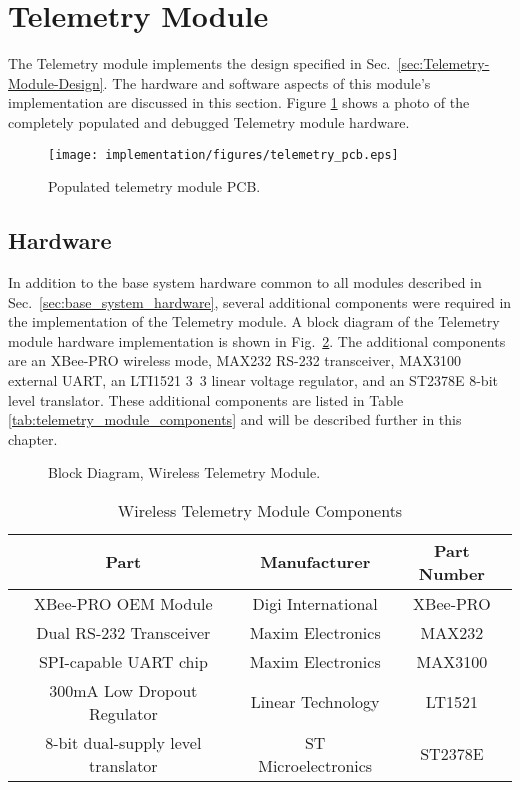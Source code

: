 \section{Telemetry Module}

The Telemetry module implements the design specified in Sec.\ \ref{sec:Telemetry-Module-Design}. The hardware and software aspects of this module's implementation are discussed in this section. Figure \ref{fig:telemetry_pcb} shows a photo of the completely populated and debugged Telemetry module hardware.

\begin{figure}[H]
\centering
\texttt{[image: implementation/figures/telemetry\_pcb.eps]}
\caption{Populated telemetry module PCB.}\label{fig:telemetry_pcb}
\end{figure}

\subsection{Hardware}

In addition to the base system hardware common to all modules described in Sec.\ \ref{sec:base_system_hardware}, several additional components were required in the implementation of the Telemetry module. A block diagram of the Telemetry module hardware implementation is shown in Fig.\ \ref{fig:telemetry_hardware_block}. The additional components are an XBee-PRO wireless mode, MAX232 RS-232 transceiver, MAX3100 external UART, an LTI1521 \unit{3.3}{\volt} linear voltage regulator, and an ST2378E 8-bit level translator. These additional components are listed in Table \ref{tab:telemetry_module_components} and will be described further in this chapter.

\begin{figure}[H]
\centering

\caption{Block Diagram, Wireless Telemetry Module.\label{fig:telemetry_hardware_block}}
\end{figure}

\begin{table}[H]
  \caption{Wireless Telemetry Module Components\label{tab:telmetry_module_components}}
  \centering
    \begin{tabular}{|c|c|c|}
      \hline 
      Part & Manufacturer & Part Number\tabularnewline
      \hline
      \hline
      XBee-PRO OEM Module & Digi International & XBee-PRO\tabularnewline
      \hline 
      Dual RS-232 Transceiver & Maxim Electronics & MAX232\tabularnewline
      \hline 
      SPI-capable UART chip & Maxim Electronics & MAX3100\tabularnewline
      \hline 
      300mA Low Dropout Regulator & Linear Technology & LT1521\tabularnewline
      \hline
      8-bit dual-supply level translator & ST Microelectronics & ST2378E\tabularnewline
      \hline
    \end{tabular}
\end{table}

